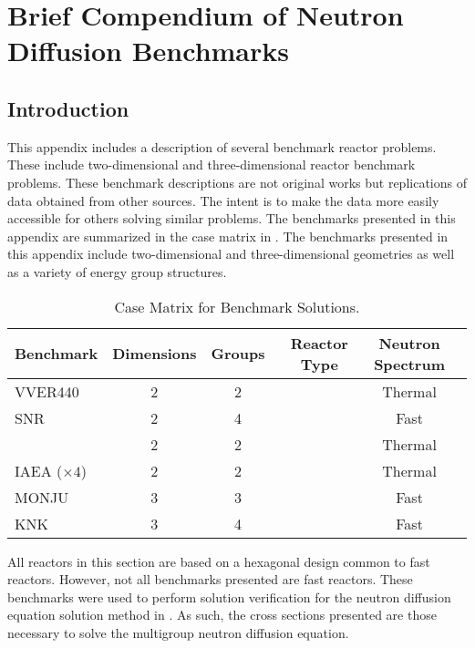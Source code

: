 \chapter{Brief Compendium of Neutron Diffusion Benchmarks}
\label{ap:benchmarks}

\section{Introduction}
  This appendix includes a description of several benchmark reactor problems.
  These include two-dimensional and three-dimensional reactor benchmark
  problems. These benchmark descriptions are not original works but
  replications of data obtained from other sources. The intent is to make the
  data more easily accessible for others solving similar problems. The
  benchmarks presented in this appendix are summarized in the case matrix in
  . The benchmarks presented in this appendix
  include two-dimensional and three-dimensional geometries as well as a variety
  of energy group structures.

  \begin{table}
    \caption{Case Matrix for Benchmark Solutions.}
    \label{tab:benchmark_case_matrix}
    \begin{center}
      \begin{tabular}{lccccc}
        \toprule
        Benchmark & Dimensions & Groups & Reactor Type &
          \parbox[t]{0.6in}{\centering Neutron \\ Spectrum} \\
        \midrule
        VVER440 & 2 & 2 &  & Thermal \\
        SNR     & 2 & 4 &  & Fast \\
             & 2 & 2 &  & Thermal \\
        IAEA ($\times4$)    & 2 & 2 &  & Thermal \\
        MONJU   & 3 & 3 &  & Fast \\
        KNK     & 3 & 4 &  & Fast \\
        \bottomrule
      \end{tabular}
    \end{center}
  \end{table}

  All reactors in this section are based on a hexagonal design common to fast
  reactors. However, not all benchmarks presented are fast reactors. These
  benchmarks were used to perform solution verification for the neutron
  diffusion equation solution method in . As such,
  the cross sections presented are those necessary to solve the multigroup
  neutron diffusion equation. 

